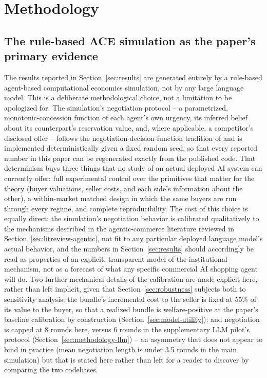 \documentclass[review]{elsarticle}
\begin{document}
\section{Methodology}

\subsection{The rule-based ACE simulation as the paper's primary evidence}
\label{sec:methodology-ace}

The results reported in Section~\ref{sec:results} are generated entirely by a rule-based agent-based computational economics simulation, not by any large language model. This is a deliberate methodological choice, not a limitation to be apologized for. The simulation's negotiation protocol -- a parametrized, monotonic-concession function of each agent's own urgency, its inferred belief about its counterpart's reservation value, and, where applicable, a competitor's disclosed offer -- follows the negotiation-decision-function tradition of \citet{faratin1998negotiation} and is implemented deterministically given a fixed random seed, so that every reported number in this paper can be regenerated exactly from the published code. That determinism buys three things that no study of an actual deployed AI system can currently offer: full experimental control over the primitives that matter for the theory (buyer valuations, seller costs, and each side's information about the other), a within-market matched design in which the same buyers are run through every regime, and complete reproducibility. The cost of this choice is equally direct: the simulation's negotiation behavior is calibrated qualitatively to the mechanisms described in the agentic-commerce literature reviewed in Section~\ref{sec:litreview-agentic}, not fit to any particular deployed language model's actual behavior, and the numbers in Section~\ref{sec:results} should accordingly be read as properties of an explicit, transparent model of the institutional mechanism, not as a forecast of what any specific commercial AI shopping agent will do. Two further mechanical details of the calibration are made explicit here, rather than left implicit, given that Section~\ref{sec:robustness} subjects both to sensitivity analysis: the bundle's incremental cost to the seller is fixed at 55\% of its value to the buyer, so that a realized bundle is welfare-positive at the paper's baseline calibration by construction (Section~\ref{sec:model-utility}); and negotiation is capped at 8 rounds here, versus 6 rounds in the supplementary LLM pilot's protocol (Section~\ref{sec:methodology-llm}) -- an asymmetry that does not appear to bind in practice (mean negotiation length is under 3.5 rounds in the main simulation) but that is stated here rather than left for a reader to discover by comparing the two codebases.
\end{document}
